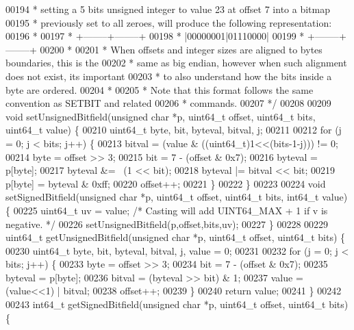 \begin{DoxyCode}
00194 \textcolor{comment}{ * setting a 5 bits unsigned integer to value 23 at offset 7 into a bitmap}
00195 \textcolor{comment}{ * previously set to all zeroes, will produce the following representation:}
00196 \textcolor{comment}{ *}
00197 \textcolor{comment}{ * +--------+--------+}
00198 \textcolor{comment}{ * |00000001|01110000|}
00199 \textcolor{comment}{ * +--------+--------+}
00200 \textcolor{comment}{ *}
00201 \textcolor{comment}{ * When offsets and integer sizes are aligned to bytes boundaries, this is the}
00202 \textcolor{comment}{ * same as big endian, however when such alignment does not exist, its important}
00203 \textcolor{comment}{ * to also understand how the bits inside a byte are ordered.}
00204 \textcolor{comment}{ *}
00205 \textcolor{comment}{ * Note that this format follows the same convention as SETBIT and related}
00206 \textcolor{comment}{ * commands.}
00207 \textcolor{comment}{ */}
00208 
00209 \textcolor{keywordtype}{void} setUnsignedBitfield(\textcolor{keywordtype}{unsigned} \textcolor{keywordtype}{char} *p, uint64\_t offset, uint64\_t bits, uint64\_t value) \{
00210     uint64\_t byte, bit, byteval, bitval, j;
00211 
00212     \textcolor{keywordflow}{for} (j = 0; j < bits; j++) \{
00213         bitval = (value & ((uint64\_t)1<<(bits-1-j))) != 0;
00214         byte = offset >> 3;
00215         bit = 7 - (offset & 0x7);
00216         byteval = p[byte];
00217         byteval &= ~(1 << bit);
00218         byteval |= bitval << bit;
00219         p[byte] = byteval & 0xff;
00220         offset++;
00221     \}
00222 \}
00223 
00224 \textcolor{keywordtype}{void} setSignedBitfield(\textcolor{keywordtype}{unsigned} \textcolor{keywordtype}{char} *p, uint64\_t offset, uint64\_t bits, int64\_t value) \{
00225     uint64\_t uv = value; \textcolor{comment}{/* Casting will add UINT64\_MAX + 1 if v is negative. */}
00226     setUnsignedBitfield(p,offset,bits,uv);
00227 \}
00228 
00229 uint64\_t getUnsignedBitfield(\textcolor{keywordtype}{unsigned} \textcolor{keywordtype}{char} *p, uint64\_t offset, uint64\_t bits) \{
00230     uint64\_t byte, bit, byteval, bitval, j, value = 0;
00231 
00232     \textcolor{keywordflow}{for} (j = 0; j < bits; j++) \{
00233         byte = offset >> 3;
00234         bit = 7 - (offset & 0x7);
00235         byteval = p[byte];
00236         bitval = (byteval >> bit) & 1;
00237         value = (value<<1) | bitval;
00238         offset++;
00239     \}
00240     \textcolor{keywordflow}{return} value;
00241 \}
00242 
00243 int64\_t getSignedBitfield(\textcolor{keywordtype}{unsigned} \textcolor{keywordtype}{char} *p, uint64\_t offset, uint64\_t bits) \{

\end{DoxyCode}
